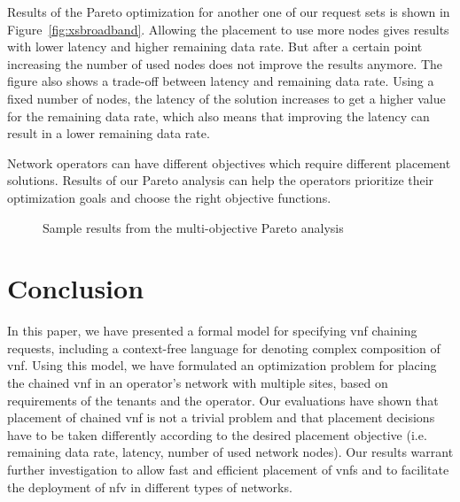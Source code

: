 \documentclass[10pt,a4paper,conference]{IEEEtran}
\begin{document}
Results of the Pareto optimization for another one of our request sets is shown 
in Figure~\ref{fig:xsbroadband}. Allowing the placement to use more
nodes gives results with lower latency and higher remaining data rate. But 
after a certain point increasing the number of used nodes does not improve the 
results anymore. The figure also 
shows a trade-off between latency and remaining data rate. Using a fixed number of 
nodes, the latency of the solution increases to get a higher value for the remaining 
data rate, which also means that improving the latency can result in 
a lower remaining data rate.

Network operators can have different objectives which require 
different placement solutions. Results of our Pareto analysis can help the operators 
prioritize their optimization goals and choose the right objective functions. 

\begin{figure}[!t]
\centerline{}
\vspace{-12pt}
\centerline{}
\caption{Sample results from the multi-objective Pareto analysis}
\label{fig:pareto}
\vspace{-2mm}
\end{figure}

\section{Conclusion}
\label{sec:conclusion}

In this paper, we have presented a formal model for specifying \ac{vnf} 
chaining requests, including a context-free language for denoting complex 
composition of \ac{vnf}. Using this model, we have formulated an optimization 
problem for placing the chained \ac{vnf} in an operator's network with multiple 
sites, based on requirements of the tenants and the operator. Our evaluations have shown that 
placement of chained \ac{vnf} is not a trivial problem and that placement decisions 
have to be taken differently according to the desired placement objective (i.e. 
remaining data rate, latency, number of used network nodes). Our results warrant 
further investigation to allow fast and efficient placement of \acp{vnf} and to 
facilitate the deployment of \ac{nfv} in different types of networks.
\end{document}
